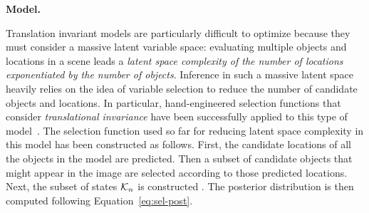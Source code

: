 \textbf{Model.}
%

Translation invariant models are particularly difficult to optimize because they must consider a massive latent variable space: evaluating multiple objects and locations in a scene leads a \textit{latent space complexity of the number of locations exponentiated by the number of objects}.
Inference in such a massive latent space heavily relies on the idea of variable selection to reduce the number of candidate objects and locations. In particular, hand-engineered selection functions that consider \emph{translational invariance} have been successfully applied to this type of model~\citep{DaiLucke2012b,DaiLucke2014,DaiEtAl2013}.
%
The selection function used so far for reducing latent space complexity in this model has been constructed as follows.
First, the candidate locations of all the objects in the model are predicted.
Then a subset of candidate objects that might appear in the image are selected according to those predicted locations.  
Next, the subset of states $\mathcal{K}_{n}$ is constructed 
.
The posterior distribution is then computed following Equation~\eqref{eq:sel-post}.

